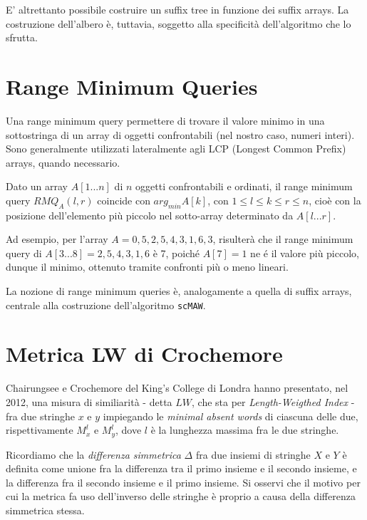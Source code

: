 E' altrettanto possibile costruire un suffix tree in funzione dei suffix arrays. La costruzione dell'albero è, tuttavia, soggetto alla specificità dell'algoritmo che lo sfrutta.

\section{Range Minimum Queries}

Una range minimum query \cite{RMQ} permettere di trovare il valore minimo in una sottostringa di un array di oggetti confrontabili (nel nostro caso, numeri interi). Sono generalmente utilizzati lateralmente agli LCP (Longest Common Prefix) arrays, quando necessario.

\vspace{3mm}

Dato un array $A[1...n]$ di $n$ oggetti confrontabili e ordinati, il range minimum query $RMQ_A (l,r)$ coincide con $arg_{min} A[k]$, con $1\leq l\leq k \leq r \leq n$, cioè con la posizione dell'elemento più piccolo nel sotto-array determinato da $A[l...r]$. 

\vspace{3mm}

Ad esempio, per l'array $A=0,5,2,5,4,3,1,6,3$, risulterà che il range minimum query di $A[3...8]=2,5,4,3,1,6$ è 7, poiché $A[7]=1$ ne é il valore più piccolo, dunque il minimo, ottenuto tramite confronti più o meno lineari.

\vspace{3mm}

La nozione di range minimum queries è, analogamente a quella di suffix arrays, centrale alla costruzione dell'algoritmo \verb|scMAW|.

\section{Metrica LW di Crochemore}

Chairungsee e Crochemore del King's College di Londra hanno presentato, nel 2012, una misura di similiarità - detta $LW$, che sta per \textit{Length-Weigthed Index} - fra due stringhe $x$ e $y$ impiegando le \textit{minimal absent words} \cite{CHAIRUNGSEE2012109} di ciascuna delle due, rispettivamente $M^l_x$ e $M^l_y$, dove $l$ è la lunghezza massima fra le due stringhe.

\vspace{3mm}

Ricordiamo che la \textit{differenza simmetrica} $\Delta$ fra due insiemi di stringhe $X$ e $Y$ è definita come unione fra la differenza tra il primo insieme e il secondo insieme, e la differenza fra il secondo insieme e il primo insieme. Si osservi che il motivo per cui la metrica fa uso dell'inverso delle stringhe è proprio a causa della differenza simmetrica stessa.

